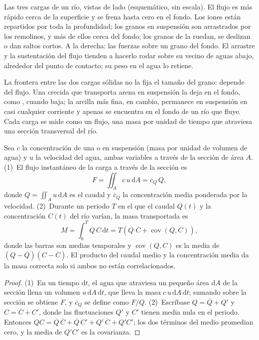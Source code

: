\begin{omfigure}
{\small Las tres cargas de un río, vistas de lado (esquemático, sin escala). El flujo es más rápido cerca de la superficie y se frena hasta
cero en el fondo. Los iones están repartidos por toda la profundidad; los granos en suspensión son arrastrados por los remolinos, y más de ellos
cerca del fondo; los granos de la  ruedan, se deslizan o dan saltos cortos. A la derecha: las fuerzas sobre un grano del fondo. El
arrastre y la sustentación del flujo tienden a hacerlo rodar sobre su vecino de aguas abajo, alrededor del punto de contacto; su peso en el agua
lo retiene.}
\label{fig:b1:erosion-transport:loads}
\end{omfigure}

La frontera entre las dos cargas sólidas no la fija el tamaño del grano: depende del flujo. Una crecida que transporta arena en suspensión la deja
en el fondo, como , cuando baja; la arcilla más fina, en cambio, permanece en suspensión en casi cualquier corriente y apenas se
encuentra en el fondo de un río que fluye. Cada carga se mide como un flujo, una masa por unidad de tiempo que atraviesa una sección transversal del río.

\begin{proposition}\label{prop:b1:erosion-transport:flux}
Sea $c$ la concentración de una  o en suspensión (masa por unidad de volumen de agua) y $u$ la velocidad del agua, ambas variables a
través de la sección de área $A$. (1)~El flujo instantáneo de la carga a través de la sección es
\[
  F = \iint_A c\,u\,\mathrm dA = \overline{c}_Q\,Q,
\]
donde $Q = \iint_A u\,\mathrm dA$ es el caudal y $\overline{c}_Q$ la concentración media ponderada por la velocidad. (2)~Durante un periodo $T$ en el que el
caudal $Q(t)$ y la concentración $C(t)$ del río varían, la masa transportada es
\[
  M = \int_0^T Q\,C\,\mathrm dt = T\left(\overline{Q}\;\overline{C} +
  \operatorname{cov}(Q, C)\right),
\]
donde las barras son medias temporales y $\operatorname{cov}(Q, C)$ es la media de
$(Q - \overline{Q})(C - \overline{C})$. El producto del caudal medio y la concentración media da la masa correcta solo si ambos no están correlacionados.
\end{proposition}

\begin{proof}
(1)~En un tiempo $\mathrm dt$, el agua que atraviesa un pequeño área $\mathrm dA$ de la sección llena un volumen $u\,\mathrm dA\,\mathrm dt$, que lleva la masa
$c\,u\,\mathrm dA\,\mathrm dt$; sumando sobre la sección se obtiene $F$, y $\overline{c}_Q$ se define como $F/Q$. (2)~Escríbase $Q = \overline{Q} + Q'$ y $C =
\overline{C} + C'$, donde las fluctuaciones $Q'$ y $C'$ tienen media nula en el periodo. Entonces $QC = \overline{Q}\,\overline{C} + \overline{Q}\,C' + Q'\,\overline{C}
+ Q'C'$; los dos términos del medio promedian cero, y la media de $Q'C'$ es la covarianza.
\end{proof}

